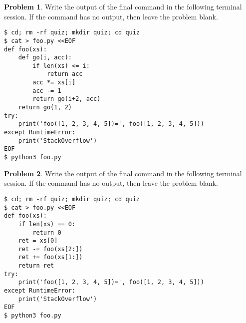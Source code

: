 \documentclass[10pt]{article}
\theoremstyle{definition}
\newtheorem{problem}{Problem}
\begin{document}
\newpage
\begin{problem}
    Write the output of the final command in the following terminal session.
    If the command has no output, then leave the problem blank.
\end{problem}
\begin{lstlisting}
$ cd; rm -rf quiz; mkdir quiz; cd quiz
$ cat > foo.py <<EOF
def foo(xs):
    def go(i, acc):
        if len(xs) <= i:
            return acc
        acc *= xs[i]
        acc -= 1
        return go(i+2, acc)
    return go(1, 2)
try:
    print('foo([1, 2, 3, 4, 5])=', foo([1, 2, 3, 4, 5]))
except RuntimeError:
    print('StackOverflow')
EOF
$ python3 foo.py
\end{lstlisting}

\newpage
\begin{problem}
    Write the output of the final command in the following terminal session.
    If the command has no output, then leave the problem blank.
\end{problem}
\begin{lstlisting}
$ cd; rm -rf quiz; mkdir quiz; cd quiz
$ cat > foo.py <<EOF
def foo(xs):
    if len(xs) == 0:
        return 0
    ret = xs[0]
    ret -= foo(xs[2:])
    ret += foo(xs[1:])
    return ret
try:
    print('foo([1, 2, 3, 4, 5])=', foo([1, 2, 3, 4, 5]))
except RuntimeError:
    print('StackOverflow')
EOF
$ python3 foo.py
\end{lstlisting}
\end{document}
